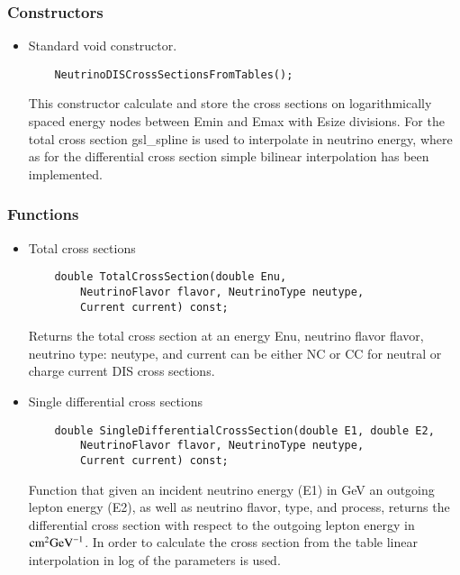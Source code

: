 \subsubsection{Constructors}

\begin{itemize}
\item Standard void constructor.
  \begin{lstlisting}
    NeutrinoDISCrossSectionsFromTables();
  \end{lstlisting}
This constructor calculate and store the cross sections on
logarithmically spaced energy nodes between {\ttfamily Emin} and
{\ttfamily Emax} with {\ttfamily Esize} divisions. For the total cross
section {\ttfamily gsl\_spline} \citep{gough2009gnu} is used to
interpolate in neutrino energy, where as for the differential cross
section simple bilinear interpolation has been implemented. 
\end{itemize}

\subsubsection{Functions}

\begin{itemize}
\item Total cross sections
  \begin{lstlisting}
    double TotalCrossSection(double Enu,
    	NeutrinoFlavor flavor, NeutrinoType neutype,
    	Current current) const;
  \end{lstlisting}
     Returns the total cross section at an energy {\ttf Enu}, neutrino flavor {\ttf flavor}, neutrino type: {\ttf neutype}, and
     {\ttf current} can be either {\ttf NC} or {\ttf CC} for neutral or charge current DIS cross sections.        
\item Single differential cross sections              
  \begin{lstlisting}
    double SingleDifferentialCrossSection(double E1, double E2,
    	NeutrinoFlavor flavor, NeutrinoType neutype,
    	Current current) const;
  \end{lstlisting}
      Function that given an incident neutrino energy ({\ttf E1}) in GeV an outgoing lepton energy ({\ttf E2}), as well as neutrino flavor,
       type, and process, returns the differential cross section with respect to the outgoing lepton energy in ${\rm cm}^2 {\rm GeV}^{-1}$. 
       In order to calculate the cross section from the table linear interpolation in log of the parameters is used.
\end{itemize}

